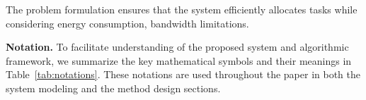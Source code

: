 The problem formulation ensures that the system efficiently allocates tasks while considering energy consumption, bandwidth limitations.


\noindent
\textbf{Notation.} To facilitate understanding of the proposed system and algorithmic framework, we summarize the key mathematical symbols and their meanings in Table~\ref{tab:notations}. These notations are used throughout the paper in both the system modeling and the method design sections.

